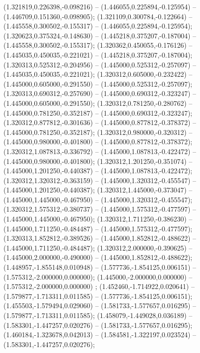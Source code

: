  (1.321819,0.226398,-0.098216) -- (1.446055,0.225894,-0.125954) -- (1.446709,0.151360,-0.098905);
 (1.321109,0.300784,-0.122664) -- (1.445558,0.300502,-0.155317) -- (1.446055,0.225894,-0.125954);
 (1.320623,0.375324,-0.148630) -- (1.445218,0.375207,-0.187004) -- (1.445558,0.300502,-0.155317);
 (1.320362,0.450055,-0.176126) -- (1.445035,0.450035,-0.221021) -- (1.445218,0.375207,-0.187004);
 (1.320313,0.525312,-0.204956) -- (1.445000,0.525312,-0.257097) -- (1.445035,0.450035,-0.221021);
 (1.320312,0.605000,-0.232422) -- (1.445000,0.605000,-0.291550) -- (1.445000,0.525312,-0.257097);
 (1.320313,0.690312,-0.257690) -- (1.445000,0.690312,-0.323247) -- (1.445000,0.605000,-0.291550);
 (1.320312,0.781250,-0.280762) -- (1.445000,0.781250,-0.352187) -- (1.445000,0.690312,-0.323247);
 (1.320312,0.877812,-0.301636) -- (1.445000,0.877812,-0.378372) -- (1.445000,0.781250,-0.352187);
 (1.320312,0.980000,-0.320312) -- (1.445000,0.980000,-0.401800) -- (1.445000,0.877812,-0.378372);
 (1.320312,1.087813,-0.336792) -- (1.445000,1.087813,-0.422472) -- (1.445000,0.980000,-0.401800);
 (1.320312,1.201250,-0.351074) -- (1.445000,1.201250,-0.440387) -- (1.445000,1.087813,-0.422472);
 (1.320312,1.320312,-0.363159) -- (1.445000,1.320312,-0.455547) -- (1.445000,1.201250,-0.440387);
 (1.320312,1.445000,-0.373047) -- (1.445000,1.445000,-0.467950) -- (1.445000,1.320312,-0.455547);
 (1.320312,1.575312,-0.380737) -- (1.445000,1.575312,-0.477597) -- (1.445000,1.445000,-0.467950);
 (1.320312,1.711250,-0.386230) -- (1.445000,1.711250,-0.484487) -- (1.445000,1.575312,-0.477597);
 (1.320313,1.852812,-0.389526) -- (1.445000,1.852812,-0.488622) -- (1.445000,1.711250,-0.484487);
 (1.320312,2.000000,-0.390625) -- (1.445000,2.000000,-0.490000) -- (1.445000,1.852812,-0.488622);
 (1.448957,-1.855148,0.010948) -- (1.577736,-1.854125,0.006151) -- (1.575312,-2.000000,0.000000);
 (1.445000,-2.000000,0.000000) -- (1.575312,-2.000000,0.000000) ;
 (1.452460,-1.714922,0.020641) -- (1.579877,-1.713311,0.011585) -- (1.577736,-1.854125,0.006151);
 (1.455503,-1.579494,0.029060) -- (1.581733,-1.577657,0.016295) -- (1.579877,-1.713311,0.011585);
 (1.458079,-1.449028,0.036189) -- (1.583301,-1.447257,0.020276) -- (1.581733,-1.577657,0.016295);
 (1.460184,-1.323678,0.042013) -- (1.584581,-1.322197,0.023524) -- (1.583301,-1.447257,0.020276);
